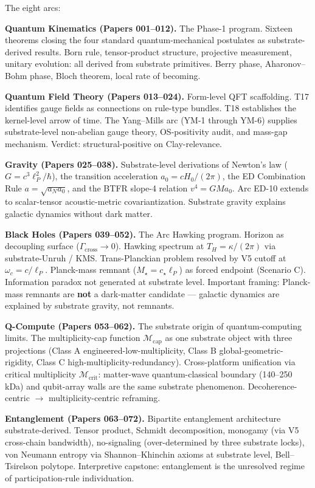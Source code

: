 \documentclass[11pt,a4paper]{article}
\begin{document}
The eight arcs:

\textbf{Quantum Kinematics (Papers 001--012).} The Phase-1 program. Sixteen theorems closing the four standard quantum-mechanical postulates as substrate-derived results. Born rule, tensor-product structure, projective measurement, unitary evolution: all derived from substrate primitives. Berry phase, Aharonov--Bohm phase, Bloch theorem, local rate of becoming.

\textbf{Quantum Field Theory (Papers 013--024).} Form-level QFT scaffolding. T17 identifies gauge fields as connections on rule-type bundles. T18 establishes the kernel-level arrow of time. The Yang--Mills arc (YM-1 through YM-6) supplies substrate-level non-abelian gauge theory, OS-positivity audit, and mass-gap mechanism. Verdict: structural-positive on Clay-relevance.

\textbf{Gravity (Papers 025--038).} Substrate-level derivations of Newton's law ($G = c^3 \ell_P^2 / \hbar$), the transition acceleration $a_0 = c H_0 / (2\pi)$, the ED Combination Rule $a = \sqrt{a_N a_0}$, and the BTFR slope-4 relation $v^4 = G M a_0$. Arc ED-10 extends to scalar-tensor acoustic-metric covariantization. Substrate gravity explains galactic dynamics without dark matter.

\textbf{Black Holes (Papers 039--052).} The Arc Hawking program. Horizon as decoupling surface ($\Gamma_\mathrm{cross} \to 0$). Hawking spectrum at $T_H = \kappa/(2\pi)$ via substrate-Unruh / KMS. Trans-Planckian problem resolved by V5 cutoff at $\omega_c = c/\ell_P$. Planck-mass remnant ($M_\star = c_\star \ell_P$) as forced endpoint (Scenario C). Information paradox not generated at substrate level. Important framing: Planck-mass remnants are \textbf{not} a dark-matter candidate --- galactic dynamics are explained by substrate gravity, not remnants.

\textbf{Q-Compute (Papers 053--062).} The substrate origin of quantum-computing limits. The multiplicity-cap function $\mathcal{M}_\mathrm{cap}$ as one substrate object with three projections (Class A engineered-low-multiplicity, Class B global-geometric-rigidity, Class C high-multiplicity-redundancy). Cross-platform unification via critical multiplicity $\mathcal{M}_\mathrm{crit}$: matter-wave quantum-classical boundary (140--250 kDa) and qubit-array walls are the same substrate phenomenon. Decoherence-centric $\to$ multiplicity-centric reframing.

\textbf{Entanglement (Papers 063--072).} Bipartite entanglement architecture substrate-derived. Tensor product, Schmidt decomposition, monogamy (via V5 cross-chain bandwidth), no-signaling (over-determined by three substrate locks), von Neumann entropy via Shannon--Khinchin axioms at substrate level, Bell--Tsirelson polytope. Interpretive capstone: entanglement is the unresolved regime of participation-rule individuation.
\end{document}
